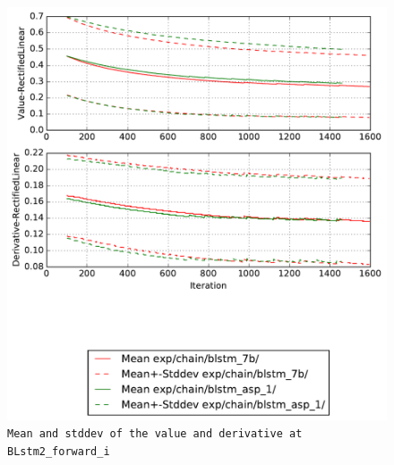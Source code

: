 \documentclass[prl,10pt,twocolumn]{revtex4}
\begin{document}
\newpage
\begin{figure}[h]
  \begin{center}
    \caption{\texttt{Mean and stddev of the value and derivative at BLstm2\_forward\_i}}
    \includegraphics[width=\textwidth]{exp/chain/blstm_7b/report/nonlinstats_BLstm2_forward_i.pdf}
  \end{center}
\end{figure}
\clearpage
\end{document}
